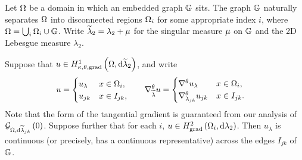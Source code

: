 \documentclass[11pt]{report}
\newcommand{\tlambda}{\widetilde{\lambda}}
\begin{document}
Let $\Omega$ be a domain in which an embedded graph $\mathbb{G}$ sits.
The graph $\mathbb{G}$ naturally separates $\Omega$ into disconnected regions $\Omega_i$ for some appropriate index $i$, where $\Omega = \bigcup_i \Omega_i \cup \mathbb{G}$.
Write $\tlambda_2 = \lambda_2 + \ddmes$ for the singular measure $\mu$ on $\mathbb{G}$ and the 2D Lebesgue measure $\lambda_2$.

\begin{prop}
	Suppose that $u\in\ktgradSob{\ddom}{\tlambda_2}$, and write
	\begin{align*}
		u = \begin{cases} u_{\lambda} & x\in\ddom_i, \\ u_{jk} & x\in I_{jk}, \end{cases}
		&\qquad
		\tgrad_{\tlambda}u = \begin{cases} \tgrad u_{\lambda} & x\in\ddom_i, \\ \tgrad_{\lambda_{jk}}u_{jk} & x\in I_{jk}. \end{cases}
	\end{align*}
	Note that the form of the tangential gradient is guaranteed from our analysis of $\gradZero{\ddom}{\tlambda_{jk}}$.
	Suppose further that for each $i$, $u\in H^2_{\mathrm{grad}}\left( \Omega_i,\mathrm{d}\lambda_2 \right)$.
	Then $u_{\lambda}$ is continuous (or precisely, has a continuous representative) across the edges $I_{jk}$ of $\mathbb{G}$.
\end{prop}
\end{document}
